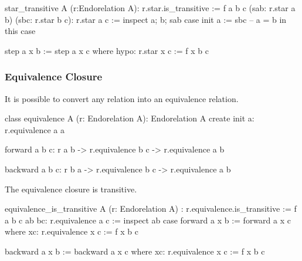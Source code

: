 \begin{alba}
    star_transitive A (r:Endorelation A): r.star.is_transitive :=
        f a b c (sab: r.star a b) (sbc: r.star b c): r.star a c :=
            inspect
                a; b; sab
            case
                init a :=
                    sbc  -- a = b in this case

                step a x b :=
                    step a x c where
                        hypo: r.star x c := f x b c
\end{alba}



\subsubsection{Equivalence Closure}

It is possible to convert any relation into an equivalence relation.



\begin{alba}
  class
    equivalence A (r: Endorelation A): Endorelation A
  create
    init a:
     r.equivalence a a

    forward a b c:
      r a b -> r.equivalence b c -> r.equivalence a b

    backward a b c:
      r b a -> r.equivalence b c -> r.equivalence a b
\end{alba}


The equivalence closure is transitive.

\begin{alba}
  equivalence_is_transitive
    A (r: Endorelation A)
    : r.equivalence.is_transitive :=
    f a b c ab bc: r.equivalence a c :=
      inspect ab case
        forward a x b :=
          forward a x c where
            xc: r.equivalence x c := f x b c

        backward a x b :=
          backward a x c where
            xc: r.equivalence x c := f x b c
\end{alba}

